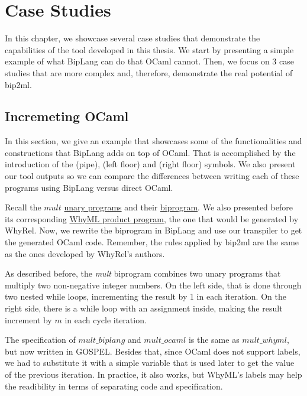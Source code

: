 
%

\chapter{Case Studies}
\label{cha:case_studies}

In this chapter, we showcase several case studies that demonstrate the capabilities of the tool developed in this thesis.
We start by presenting a simple example of what BipLang can do that OCaml cannot.
Then, we focus on 3 case studies that are more complex and, therefore, demonstrate the real potential of bip2ml.


\section{Incremeting OCaml}
\label{sec:incrementing}

In this section, we give an example that showcases some of the functionalities and constructions that BipLang adds on top of OCaml.
That is accomplished by the introduction of the \bm{$\langle|\rangle$} (pipe), \bm{$\lfloor$} (left floor) and \bm{$\rfloor$} (right floor) symbols.
We also present our tool outputs so we can compare the differences between writing each of these programs using BipLang versus direct OCaml.

Recall the $mult$ \hyperref[fig:mult_source_programs]{unary programs} and their \hyperref[fig:mult_biprogram]{biprogram}.
We also presented before its corresponding \hyperref[fig:translation_ex]{WhyML product program}, the one that would be generated by WhyRel.
Now, we rewrite the biprogram in BipLang and use our transpiler to get the generated OCaml code.
Remember, the rules applied by bip2ml are the same as the ones developed by WhyRel's authors.

As described before, the \emph{mult} biprogram combines two unary programs that multiply two non-negative integer numbers.
On the left side, that is done through two nested while loops, incrementing the result by 1 in each iteration.
On the right side, there is a while loop with an assignment inside, making the result increment by $m$ in each cycle iteration.

The specification of $mult\_biplang$ and $mult\_ocaml$ is the same as $mult\_whyml$, but now written in GOSPEL.
Besides that, since OCaml does not support labels, we had to substitute it with a simple variable that is used later to get the value of the previous iteration.
In practice, it also works, but WhyML's labels may help the readibility in terms of separating code and specification.

